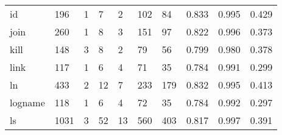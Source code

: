 \begin{longtable}{lp{1.3cm}p{1.3cm}p{1.3cm}p{1.3cm}p{1.3cm}p{1.3cm}p{1.3cm}p{1.3cm}p{1.3cm}}
id        &                    196 &                                  1 &                                 7 &                                2 &                               102 &                              84 &                                   0.833 &                                  0.995 &                                0.429 \\
join      &                    260 &                                  1 &                                 8 &                                3 &                               151 &                              97 &                                   0.822 &                                  0.996 &                                0.373 \\
kill      &                    148 &                                  3 &                                 8 &                                2 &                                79 &                              56 &                                   0.799 &                                  0.980 &                                0.378 \\
link      &                    117 &                                  1 &                                 6 &                                4 &                                71 &                              35 &                                   0.784 &                                  0.991 &                                0.299 \\
ln        &                    433 &                                  2 &                                12 &                                7 &                               233 &                             179 &                                   0.832 &                                  0.995 &                                0.413 \\
logname   &                    118 &                                  1 &                                 6 &                                4 &                                72 &                              35 &                                   0.784 &                                  0.992 &                                0.297 \\
ls        &                   1031 &                                  3 &                                52 &                               13 &                               560 &                             403 &                                   0.817 &                                  0.997 &                                0.391 \\

\end{longtable}
